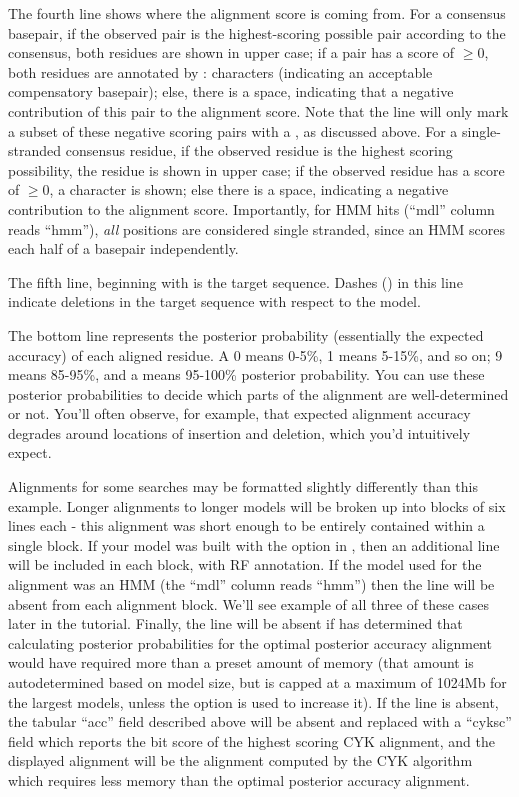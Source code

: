The fourth line shows where the alignment score is coming from. For a
consensus basepair, if the observed pair is the highest-scoring
possible pair according to the consensus, both residues are shown in
upper case; if a pair has a score of $\geq 0$, both residues are
annotated by : characters (indicating an acceptable compensatory
basepair); else, there is a space, indicating that a negative
contribution of this pair to the alignment score. Note that the 
 line will only mark a subset of these negative scoring
pairs with a , as discussed above.
For a single-stranded consensus residue, if the observed residue is
the highest scoring possibility, the residue is shown in upper case;
if the observed residue has a score of $\geq 0$, a \otext{+} character
is shown; else there is a space, indicating a negative contribution to
the alignment score. Importantly, for HMM hits (``mdl'' column reads
``hmm''), \emph{all} positions are considered single stranded, since
an HMM scores each half of a basepair independently.

The fifth line, beginning with  is
the target sequence. Dashes (\otext{-}) in this line indicate deletions
in the target sequence with respect to the model.

The bottom line represents the posterior probability (essentially the
expected accuracy) of each aligned residue. A 0 means 0-5\%, 1 means
5-15\%, and so on; 9 means 85-95\%, and a \otext{*} means 95-100\%
posterior probability. You can use these posterior probabilities to
decide which parts of the alignment are well-determined or not. You'll
often observe, for example, that expected alignment accuracy degrades
around locations of insertion and deletion, which you'd intuitively
expect.

Alignments for some searches may be formatted slightly differently
than this example. Longer alignments to longer models will be broken
up into blocks of six lines each - this alignment was short enough to
be entirely contained within a single block.  If your model was built
with the  option in , then an additional
line will be included in each block, with RF annotation.  If the model
used for the alignment was an HMM (the ``mdl'' column reads ``hmm'')
then the  line will be absent from each alignment
block. We'll see example of all three of these cases later in the
tutorial. Finally, the  line will be absent if
 has determined that calculating posterior
probabilities for the optimal posterior accuracy alignment would have
required more than a preset amount of memory (that amount is
autodetermined based on model size, but is capped at a maximum of
1024Mb for the largest models, unless the  option is
used to increase it). If the  line is absent, the tabular
``acc'' field described above will be absent and replaced with a
``cyksc'' field which reports the bit score of the highest scoring CYK
alignment, and the displayed alignment will be the alignment computed
by the CYK algorithm which requires less memory than the optimal
posterior accuracy alignment.

